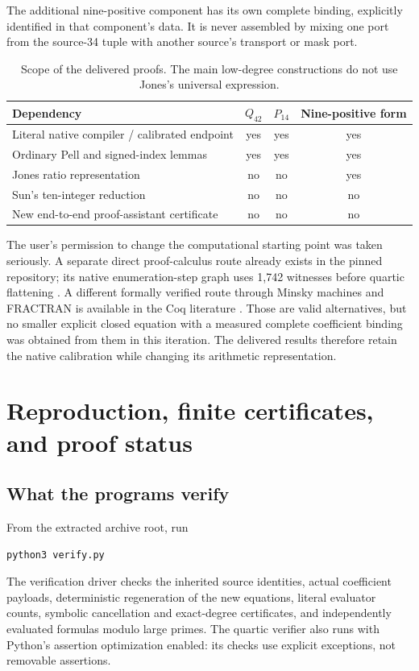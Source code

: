 \documentclass[11pt,a4paper]{article}
\theoremstyle{remark}\newtheorem{remark}[theorem]{Remark}
\begin{document}
The additional nine-positive component has its own complete binding,
explicitly identified in that component's data. It is never assembled by
mixing one port from the source-34 tuple with another source's transport
or mask port.

\begin{table}[htbp]\centering\small
\begin{tabular}{@{}lccc@{}}\toprule
Dependency & $Q_{42}$ & $P_{14}$ & Nine-positive form\\\midrule
Literal native compiler / calibrated endpoint &yes&yes&yes\\
Ordinary Pell and signed-index lemmas &yes&yes&yes\\
Jones ratio representation &no&no&yes\\
Sun's ten-integer reduction &no&no&no\\
New end-to-end proof-assistant certificate &no&no&no\\\bottomrule
\end{tabular}
\caption{Scope of the delivered proofs. The main low-degree constructions
do not use Jones's universal expression.}
\end{table}

The user's permission to change the computational starting point was
taken seriously. A separate direct proof-calculus route already exists
in the pinned repository; its native enumeration-step graph uses 1,742
witnesses before quartic flattening
\cite{nativegraph}. A different formally verified route through Minsky
machines and FRACTRAN is available in the Coq literature \cite{coqh10}.
Those are valid alternatives, but no smaller explicit closed equation
with a measured complete coefficient binding was obtained from them in
this iteration. The delivered results therefore retain the native
calibration while changing its arithmetic representation.

\section{Reproduction, finite certificates, and proof status}
\label{sec:boundary}

\subsection{What the programs verify}

From the extracted archive root, run
\begin{verbatim}
python3 verify.py
\end{verbatim}
The verification driver checks the inherited source identities, actual
coefficient payloads, deterministic regeneration of the new equations,
literal evaluator counts, symbolic cancellation and exact-degree
certificates, and independently evaluated formulas modulo large primes.
The quartic verifier also runs with Python's assertion optimization enabled:
its checks use explicit exceptions, not removable assertions.
\end{document}
